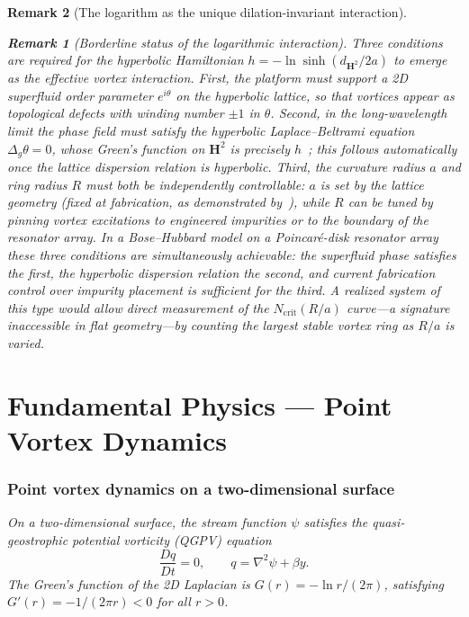 \documentclass[12pt, a4paper]{article}
\newtheorem{remark}{Remark}[section]
\numberwithin{equation}{section}
\begin{document}
\begin{remark}[The logarithm as the unique dilation-invariant interaction]
\begin{remark}[Borderline status of the logarithmic interaction]
Three conditions are required for the hyperbolic Hamiltonian
$h = -\ln\sinh(d_{\mathbf{H}^2}/2a)$ to emerge as the effective vortex
interaction.  First, the platform must support a 2D superfluid order
parameter $e^{i\theta}$ on the hyperbolic lattice, so that vortices
appear as topological defects with winding number $\pm 1$ in $\theta$.
Second, in the long-wavelength limit the phase field must satisfy the
hyperbolic Laplace--Beltrami equation $\Delta_g\theta = 0$, whose
Green's function on $\mathbf{H}^2$ is precisely $h$~\citep{Kimura1999};
this follows automatically once the lattice dispersion relation is
hyperbolic.  Third, the curvature radius $a$ and ring radius $R$ must
both be independently controllable: $a$ is set by the lattice geometry
(fixed at fabrication, as demonstrated by~\citealt{Kollar2019}),
while $R$ can be tuned by pinning vortex excitations to engineered
impurities or to the boundary of the resonator array.  In a
Bose--Hubbard model on a Poincar\'e-disk resonator array these three
conditions are simultaneously achievable: the superfluid phase
satisfies the first, the hyperbolic dispersion relation the second,
and current fabrication control over impurity placement is sufficient
for the third.  A realized system of this type would allow direct
measurement of the $N_{\mathrm{crit}}(R/a)$ curve---a signature
inaccessible in flat geometry---by counting the largest stable
vortex ring as $R/a$ is varied.



\part{Fundamental Physics --- Point Vortex Dynamics}
\label{part:pvd}

\section{Point vortex dynamics on a two-dimensional surface}
\label{sec:pvd}

On a two-dimensional surface, the stream function $\psi$ satisfies the
quasi-geostrophic potential vorticity (QGPV) equation
\begin{equation}\label{eq:qgpv}
  \frac{Dq}{Dt} = 0, \qquad q = \nabla^2\psi + \beta y.
\end{equation}
The Green's function of the 2D Laplacian is
$G(r) = -\ln r / (2\pi)$,
satisfying $G'(r) = -1/(2\pi r) < 0$ for all $r > 0$.


\end{remark}
\end{remark}
\end{document}
